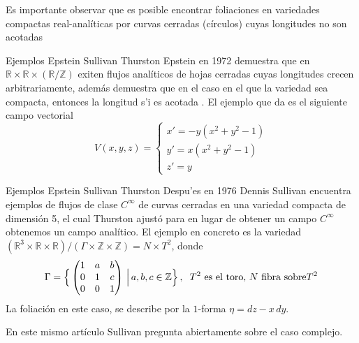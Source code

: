 \documentclass[letterpaper]{beamer}
\newcommand{\zah}{\ensuremath{ \mathbb Z }}
\newcommand{\re}{\ensuremath{\mathbb R }}
\begin{document}
\begin{frame}
  Es importante observar que es posible encontrar foliaciones en variedades compactas real-anal\'iticas por curvas cerradas (c\'irculos) cuyas
  longitudes no son acotadas
    \begin{block}{Ejemplos Epstein Sullivan Thurston}
      Epstein en 1972 demuestra que en $\re\times\re\times(\re/\zah)$ exiten flujos anal\'iticos de hojas cerradas cuyas longitudes crecen arbitrariamente,
      adem\'as demuestra que en el caso en el que la variedad sea compacta, entonces la longitud s'i es acotada \cite{Epstein2}. El ejemplo que da es el siguiente campo vectorial
      \begin{equation}
        V(x,y,z)=
        \begin{cases}
            x' = -y(x^{2} + y^{2} - 1)\\
            y' = x(x^{2} + y^{2} - 1)\\
            z' = y
        \end{cases}
      \end{equation}
    \end{block}
\end{frame}

\begin{frame}
  \begin{block}{Ejemplos Epstein Sullivan Thurston}
    Despu'es en 1976 Dennis Sullivan \cite{Sullivan} encuentra ejemplos de flujos de clase $C^{\infty}$ de curvas cerradas en una variedad compacta de dimensi\'on
    5, el cual Thurston ajust\'o para en lugar de obtener un campo $C^{\infty}$ obtenemos un campo anal\'itico. El ejemplo en concreto es la variedad
    $(\re^{3}\times\re\times\re)/(\Gamma\times\zah\times\zah)=N\times T^{2}$, donde
    \begin{equation}
      \Gamma=\Big\{
      \begin{pmatrix}
        1 & a & b\\
        0 & 1 & c\\
        0 & 0 & 1
      \end{pmatrix}
      \,\Big\vert\, a,b,c\in\zah
      \Big\}\, ,\hspace{0.2cm}T^{2}\text{ es el toro, }N\text{ fibra sobre}T^{2}
    \end{equation}
    La foliaci\'on en este caso, se describe por la $1$-forma $\eta=dz-x\,dy$.
  \end{block}
   En este mismo art\'iculo Sullivan pregunta abiertamente sobre el caso complejo.
\end{frame}
\end{document}
